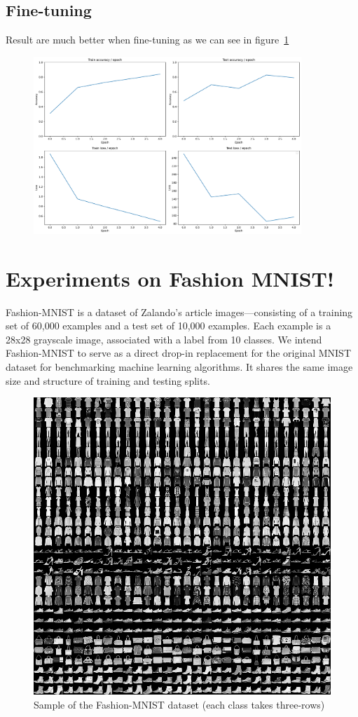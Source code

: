 \subsection{Fine-tuning}
Result are much better when fine-tuning as we can see in figure~\ref{fig:stats_vit_pretrained}
\begin{figure}[H]
    \centering
    \includegraphics*[width=0.9\textwidth]{figs/Transformers/stats_vit_pretrained.pdf}
    \caption{}
    \label{fig:stats_vit_pretrained}
\end{figure}

\section{Experiments on Fashion MNIST!}
Fashion-MNIST is a dataset of Zalando's article images—consisting of a training set of 60,000 examples and a test set of 10,000 examples. Each example is a 28x28 grayscale image, associated with a label from 10 classes. We intend Fashion-MNIST to serve as a direct drop-in replacement for the original MNIST dataset for benchmarking machine learning algorithms. It shares the same image size and structure of training and testing splits.

\begin{figure}[H]
    \centering
    \includegraphics*[width=.6\textwidth]{figs/Transformers/fashion-mnist-sprite.png}
    \caption{Sample of the Fashion-MNIST dataset (each class takes three-rows)}
\end{figure}


